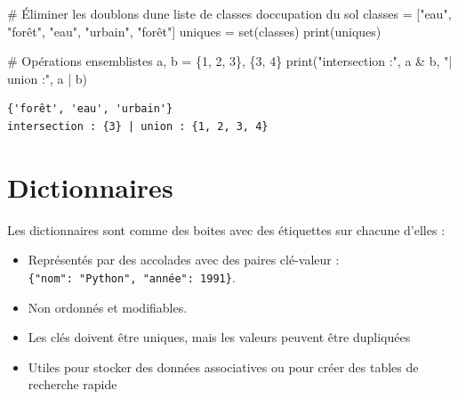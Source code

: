 \documentclass[
  french,
  11pt,
  letterpaper,
  open=any,
  twoside=false,
  french]{scrbook}
\newenvironment{Shaded}{\begin{snugshade}}{\end{snugshade}}
\newcommand{\BuiltInTok}[1]{\textcolor[rgb]{0.00,0.23,0.31}{#1}}
\newcommand{\CommentTok}[1]{\textcolor[rgb]{0.37,0.37,0.37}{#1}}
\newcommand{\DecValTok}[1]{\textcolor[rgb]{0.68,0.00,0.00}{#1}}
\newcommand{\NormalTok}[1]{\textcolor[rgb]{0.00,0.23,0.31}{#1}}
\newcommand{\OperatorTok}[1]{\textcolor[rgb]{0.37,0.37,0.37}{#1}}
\newcommand{\StringTok}[1]{\textcolor[rgb]{0.13,0.47,0.30}{#1}}
\begin{document}
\begin{Shaded}
\begin{Highlighting}[]
\CommentTok{\# Éliminer les doublons d\textquotesingle{}une liste de classes d\textquotesingle{}occupation du sol}
\NormalTok{classes }\OperatorTok{=}\NormalTok{ [}\StringTok{"eau"}\NormalTok{, }\StringTok{"forêt"}\NormalTok{, }\StringTok{"eau"}\NormalTok{, }\StringTok{"urbain"}\NormalTok{, }\StringTok{"forêt"}\NormalTok{]}
\NormalTok{uniques }\OperatorTok{=} \BuiltInTok{set}\NormalTok{(classes)}
\BuiltInTok{print}\NormalTok{(uniques)}

\CommentTok{\# Opérations ensemblistes}
\NormalTok{a, b }\OperatorTok{=}\NormalTok{ \{}\DecValTok{1}\NormalTok{, }\DecValTok{2}\NormalTok{, }\DecValTok{3}\NormalTok{\}, \{}\DecValTok{3}\NormalTok{, }\DecValTok{4}\NormalTok{\}}
\BuiltInTok{print}\NormalTok{(}\StringTok{"intersection :"}\NormalTok{, a }\OperatorTok{\&}\NormalTok{ b, }\StringTok{"| union :"}\NormalTok{, a }\OperatorTok{|}\NormalTok{ b)}
\end{Highlighting}
\end{Shaded}

\begin{verbatim}
{'forêt', 'eau', 'urbain'}
intersection : {3} | union : {1, 2, 3, 4}
\end{verbatim}

\section{Dictionnaires}\label{dictionnaires}

Les dictionnaires sont comme des boites avec des étiquettes sur chacune
d'elles :

\begin{itemize}
\item
  Représentés par des accolades avec des paires clé-valeur :
  \texttt{\{"nom":\ "Python",\ "année":\ 1991\}}.
\item
  Non ordonnés et modifiables.
\item
  Les clés doivent être uniques, mais les valeurs peuvent être
  dupliquées
\item
  Utiles pour stocker des données associatives ou pour créer des tables
  de recherche rapide
\end{itemize}
\end{document}
